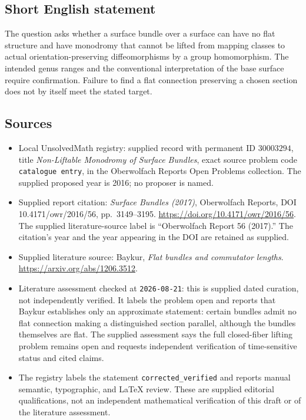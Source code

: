\documentclass[11pt]{article}
\begin{document}
\subsection{Short English statement}
The question asks whether a surface bundle over a surface can have no flat structure and have monodromy that cannot be lifted from mapping classes to actual orientation-preserving diffeomorphisms by a group homomorphism. The intended genus ranges and the conventional interpretation of the base surface require confirmation. Failure to find a flat connection preserving a chosen section does not by itself meet the stated target.
\subsection{Sources}
\begin{itemize}
\item Local UnsolvedMath registry: supplied record with permanent ID \(30003294\), title \emph{Non-Liftable Monodromy of Surface Bundles}, exact source problem code \texttt{catalogue entry}, in the Oberwolfach Reports Open Problems collection. The supplied proposed year is 2016; no proposer is named.
\item Supplied report citation: \emph{Surface Bundles (2017)}, Oberwolfach Reports, DOI 10.4171/owr/2016/56, pp.\ 3149--3195. \url{https://doi.org/10.4171/owr/2016/56}. The supplied literature-source label is ``Oberwolfach Report 56 (2017).'' The citation's year and the year appearing in the DOI are retained as supplied.
\item Supplied literature source: Baykur, \emph{Flat bundles and commutator lengths}. \url{https://arxiv.org/abs/1206.3512}.
\item Literature assessment checked at \texttt{2026-08-21}: this is supplied dated curation, not independently verified. It labels the problem open and reports that Baykur establishes only an approximate statement: certain bundles admit no flat connection making a distinguished section parallel, although the bundles themselves are flat. The supplied assessment says the full closed-fiber lifting problem remains open and requests independent verification of time-sensitive status and cited claims.
\item The registry labels the statement \texttt{corrected\_verified} and reports manual semantic, typographic, and LaTeX review. These are supplied editorial qualifications, not an independent mathematical verification of this draft or of the literature assessment.
\end{itemize}
\end{document}
